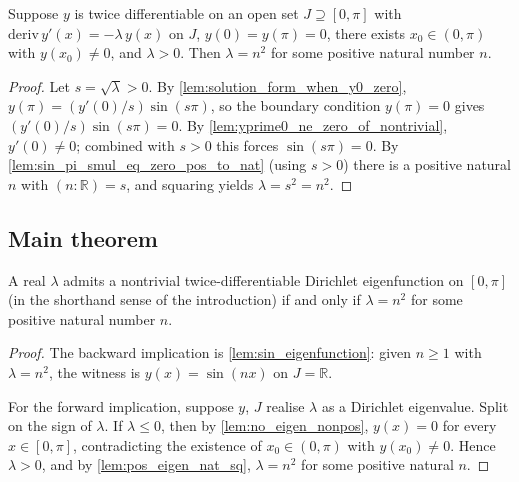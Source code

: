 \begin{lemma}
    \label{lem:pos_eigen_nat_sq}
    \leanok
    Suppose $y$ is twice differentiable on an open set $J \supseteq [0,\pi]$
    with $\mathrm{deriv}\, y'(x) = -\lambda \, y(x)$ on $J$, $y(0) = y(\pi) = 0$,
    there exists $x_0 \in (0,\pi)$ with $y(x_0) \neq 0$, and $\lambda > 0$. Then
    $\lambda = n^2$ for some positive natural number $n$.
\end{lemma}
\begin{proof}
    Let $s = \sqrt{\lambda} > 0$. By \cref{lem:solution_form_when_y0_zero},
    $y(\pi) = (y'(0)/s) \sin(s\pi)$, so the boundary condition $y(\pi) = 0$ gives
    $(y'(0)/s) \sin(s\pi) = 0$. By \cref{lem:yprime0_ne_zero_of_nontrivial},
    $y'(0) \neq 0$; combined with $s > 0$ this forces $\sin(s\pi) = 0$. By
    \cref{lem:sin_pi_smul_eq_zero_pos_to_nat} (using $s > 0$) there is a
    positive natural $n$ with $(n : \mathbb{R}) = s$, and squaring yields
    $\lambda = s^2 = n^2$.
\end{proof}

\subsection{Main theorem}

\begin{theorem}[{Dirichlet eigenvalues of $-y'' = \lambda y$ on $[0,\pi]$}]
    \label{thm:dirichlet_eigenvalues_eq_nat_sq}
    \leanok
    A real $\lambda$ admits a nontrivial twice-differentiable Dirichlet
    eigenfunction on $[0,\pi]$ (in the shorthand sense of the introduction) if
    and only if $\lambda = n^2$ for some positive natural number $n$.
\end{theorem}
\begin{proof}
    The backward implication is \cref{lem:sin_eigenfunction}: given $n \ge 1$
    with $\lambda = n^2$, the witness is $y(x) = \sin(nx)$ on $J = \mathbb{R}$.

    For the forward implication, suppose $y$, $J$ realise $\lambda$ as a
    Dirichlet eigenvalue. Split on the sign of $\lambda$. If $\lambda \le 0$,
    then by \cref{lem:no_eigen_nonpos}, $y(x) = 0$ for every $x \in [0,\pi]$,
    contradicting the existence of $x_0 \in (0,\pi)$ with $y(x_0) \neq 0$. Hence
    $\lambda > 0$, and by \cref{lem:pos_eigen_nat_sq}, $\lambda = n^2$ for some
    positive natural $n$.
\end{proof}


